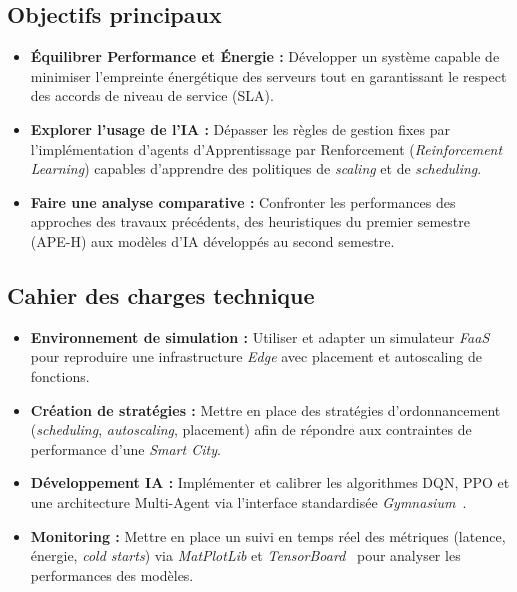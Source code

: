
\subsection{Objectifs principaux}
\begin{itemize}
    \item \textbf{Équilibrer Performance et Énergie :} Développer un système capable de minimiser l'empreinte énergétique des serveurs tout en garantissant le respect des accords de niveau de service (SLA).
    \item \textbf{Explorer l'usage de l'IA :} Dépasser les règles de gestion fixes par l'implémentation d'agents d'Apprentissage par Renforcement (\textit{Reinforcement Learning}) capables d'apprendre des politiques de \textit{scaling} et de \textit{scheduling}.
    \item \textbf{Faire une analyse comparative :} Confronter les performances des approches des travaux précédents, des heuristiques du premier semestre (APE-H) aux modèles d'IA développés au second semestre.
\end{itemize}

\subsection{Cahier des charges technique}
\begin{itemize}
    \item \textbf{Environnement de simulation :} Utiliser et adapter un simulateur \textit{FaaS} pour reproduire une infrastructure \textit{Edge} avec placement et autoscaling de fonctions.
    \item \textbf{Création de stratégies :} Mettre en place des stratégies d'ordonnancement (\textit{scheduling}, \textit{autoscaling}, placement) afin de répondre aux contraintes de performance d'une \textit{Smart City}.
    \item \textbf{Développement IA :} Implémenter et calibrer les algorithmes DQN, PPO et une architecture Multi-Agent via l'interface standardisée \textit{Gymnasium}~\cite{brockman2016gym}.
    \item \textbf{Monitoring :} Mettre en place un suivi en temps réel des métriques (latence, énergie, \textit{cold starts}) via \textit{MatPlotLib} et \textit{TensorBoard}~\cite{abadi2016tensorflow} pour analyser les performances des modèles.
\end{itemize}
